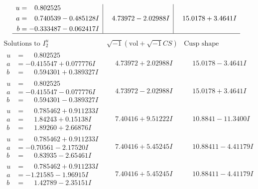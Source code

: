 \documentclass[1p]{elsarticle_modified}
\theoremstyle{definition}
\newcommand{\I}{\sqrt{-1}}
\begin{document}
$$\begin{array}{c|c|c}
\begin{aligned}
u &= \phantom{-}0.802525\phantom{ +0.000000I} \\
a &= \phantom{-}0.740539 - 0.485128 I \\
b &= -0.333487 - 0.062417 I\end{aligned}
 & \phantom{-}4.73972 - 2.02988 I & \phantom{-}15.0178 + 3.4641 I\\
 \hline 
 \end{array}$$\newpage$$\begin{array}{c|c|c}  
\text{Solutions to }I^u_{2}& \I (\text{vol} + \sqrt{-1}CS) & \text{Cusp shape}\\
 \hline 
\begin{aligned}
u &= \phantom{-}0.802525\phantom{ +0.000000I} \\
a &= -0.415547 + 0.077776 I \\
b &= \phantom{-}0.594301 + 0.389327 I\end{aligned}
 & \phantom{-}4.73972 + 2.02988 I & \phantom{-}15.0178 - 3.4641 I \\ \hline\begin{aligned}
u &= \phantom{-}0.802525\phantom{ +0.000000I} \\
a &= -0.415547 - 0.077776 I \\
b &= \phantom{-}0.594301 - 0.389327 I\end{aligned}
 & \phantom{-}4.73972 - 2.02988 I & \phantom{-}15.0178 + 3.4641 I \\ \hline\begin{aligned}
u &= \phantom{-}0.785462 + 0.911233 I \\
a &= \phantom{-}1.84243 + 0.15138 I \\
b &= \phantom{-}1.89260 + 2.66876 I\end{aligned}
 & \phantom{-}7.40416 + 9.51222 I & \phantom{-}10.8841 - 11.3400 I \\ \hline\begin{aligned}
u &= \phantom{-}0.785462 + 0.911233 I \\
a &= -0.70561 - 2.17520 I \\
b &= \phantom{-}0.83935 - 2.65461 I\end{aligned}
 & \phantom{-}7.40416 + 5.45245 I & \phantom{-}10.88411 - 4.41179 I \\ \hline\begin{aligned}
u &= \phantom{-}0.785462 + 0.911233 I \\
a &= -1.21585 - 1.96915 I \\
b &= \phantom{-}1.42789 - 2.35151 I\end{aligned}
 & \phantom{-}7.40416 + 5.45245 I & \phantom{-}10.88411 - 4.41179 I \\ \hline\begin{aligned}

\end{aligned}
\end{array}$$
\end{document}
